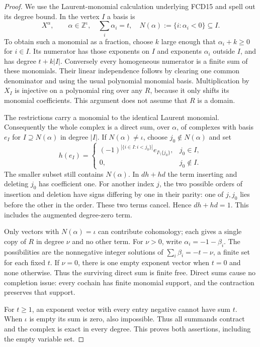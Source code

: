 \begin{proof}
We use the Laurent-monomial calculation underlying FCD15 and spell
out its degree bound.  In the vertex $I$ a basis is
\[
 X^\alpha,\qquad
 \alpha\in\mathbb Z^\iota,\quad
 \sum_i\alpha_i=t,\quad
 N(\alpha):=\{i:\alpha_i<0\}\subseteq I .
                                                        \tag{SHV.6}
\]
To obtain such a monomial as a fraction, choose $k$ large enough that
$\alpha_i+k\ge0$ for $i\in I$.  Its numerator has those exponents
on $I$ and exponents $\alpha_i$ outside $I$, and has degree
$t+k|I|$.  Conversely every homogeneous numerator is a finite sum
of these monomials.  Their linear independence follows by clearing
one common denominator and using the usual polynomial monomial
basis.  Multiplication by $X_I$ is injective on a polynomial ring
over any $R$, because it only shifts its monomial coefficients.
This argument does not assume that $R$ is a domain.

The restrictions carry a monomial to the identical Laurent monomial.
Consequently the whole complex is a direct sum, over $\alpha$, of
complexes with basis $e_I$ for $I\supseteq N(\alpha)$ in degree $|I|$.
If $N(\alpha)\ne\iota$, choose $j_0\notin N(\alpha)$ and set
\[
 h(e_I)=
 \begin{cases}
 (-1)^{|\{i\in I:i<j_0\}|}e_{I\setminus\{j_0\}},&j_0\in I,\\
 0,&j_0\notin I.
 \end{cases}                                           \tag{SHV.7}
\]
The smaller subset still contains $N(\alpha)$.  In $dh+hd$ the
term inserting and deleting $j_0$ has coefficient one.  For
another index $j$, the two possible orders of insertion and deletion
have signs differing by one in their parity: one of $j,j_0$ lies
before the other in the order.  These two terms cancel.  Hence
$dh+hd=1$.  This includes the augmented degree-zero term.

Only vectors with $N(\alpha)=\iota$ can contribute cohomology;
each gives a single copy of $R$ in degree $\nu$ and no other term.
For $\nu>0$, write $\alpha_i=-1-\beta_i$.  The possibilities are
the nonnegative integer solutions of
$\sum_i\beta_i=-t-\nu$, a finite set for each fixed $t$.
If $\nu=0$, there is one empty exponent vector when $t=0$ and
none otherwise.  Thus the surviving direct sum is finite free.
Direct sums cause no completion issue: every cochain has finite
monomial support, and the contraction preserves that support.

For $t\ge1$, an exponent vector with every entry negative cannot
have sum $t$.  When $\iota$ is empty its sum is zero, also
impossible.  Thus all summands contract and the complex is exact
in every degree.  This proves both assertions, including the
empty variable set.
\end{proof}

